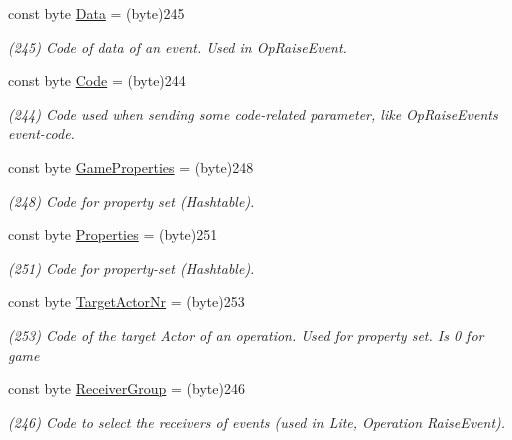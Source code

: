 \begin{DoxyCompactItemize}
const byte \hyperlink{class_exit_games_1_1_client_1_1_photon_1_1_parameter_code_af0ac326ecfd07601a765a21130f74d81}{Data} = (byte)245
\begin{DoxyCompactList}\small\item\em (245) Code of data of an event. Used in Op\+Raise\+Event.\end{DoxyCompactList}\item 
const byte \hyperlink{class_exit_games_1_1_client_1_1_photon_1_1_parameter_code_aba38939b84deab55de596db4d7f13d6e}{Code} = (byte)244
\begin{DoxyCompactList}\small\item\em (244) Code used when sending some code-\/related parameter, like Op\+Raise\+Event\textquotesingle{}s event-\/code. \end{DoxyCompactList}\item 
const byte \hyperlink{class_exit_games_1_1_client_1_1_photon_1_1_parameter_code_a0637f72ee1fd11dfd90022bf7c758720}{Game\+Properties} = (byte)248
\begin{DoxyCompactList}\small\item\em (248) Code for property set (Hashtable).\end{DoxyCompactList}\item 
const byte \hyperlink{class_exit_games_1_1_client_1_1_photon_1_1_parameter_code_a9fbcbc9fff142b9064f18c9efc91f6ac}{Properties} = (byte)251
\begin{DoxyCompactList}\small\item\em (251) Code for property-\/set (Hashtable). \end{DoxyCompactList}\item 
const byte \hyperlink{class_exit_games_1_1_client_1_1_photon_1_1_parameter_code_a95715a5fafe5254ee1e792419867a8da}{Target\+Actor\+Nr} = (byte)253
\begin{DoxyCompactList}\small\item\em (253) Code of the target Actor of an operation. Used for property set. Is 0 for game\end{DoxyCompactList}\item 
const byte \hyperlink{class_exit_games_1_1_client_1_1_photon_1_1_parameter_code_a66d8a56e50e4d9b1864ef0dfe6b7c64a}{Receiver\+Group} = (byte)246
\begin{DoxyCompactList}\small\item\em (246) Code to select the receivers of events (used in Lite, Operation Raise\+Event).\end{DoxyCompactList}\item 

\end{DoxyCompactItemize}
